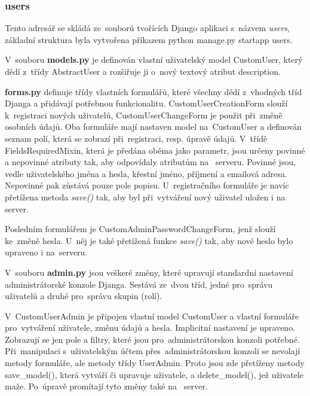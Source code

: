 \subsubsection{users}

Tento adresář se skládá ze~souborů tvořících Django aplikaci s~názvem
\textit{users}, základní struktura byla vytvořena příkazem
\textsf{python manage.py startapp users}.

V~souboru \textbf{models.py} je definován vlastní uživatelský model
\textsf{CustomUser}, který dědí z~třídy \textsf{AbstractUser} a
rozšiřuje ji o~nový textový atribut \textsf{description}.

\textbf{forms.py} definuje třídy vlastních formulářů, které všechny
dědí z~vhodných tříd Djanga a přidávají potřebnou
funkcionalitu. \textsf{CustomUserCreationForm} slouží k~registraci
nových uživatelů, \textsf{CustomUserChangeForm} je použit při~změně
osobních údajů. Oba formuláře mají nastaven model na~\textsf{CustomUser} 
a definován seznam polí, která se zobrazí při~registraci, 
resp. úpravě údajů. V~třídě \textsf{FieldsRequiredMixin},
která je předána oběma jako parametr, jsou určeny povinné a nepovinné
atributy tak, aby odpovídaly atributům na~ serveru. Povinné
jsou, vedle uživatelského jména a hesla, křestní jméno, příjmení a
emailová adresa. Nepovinné pak zůstává pouze pole popisu. 
U~registračního formuláře je navíc přetížena metoda \textit{save()} tak,
aby byl při~vytváření nový uživatel uložen i na~ server.

Posledním formulářem je \textsf{CustomAdminPasswordChangeForm}, jenž
slouží ke~změně hesla. U~něj je také přetížená funkce \textit{save()}
tak, aby nové heslo bylo upraveno i na~serveru.

V~souboru \textbf{admin.py} jsou veškeré změny, které upravují
standardní nastavení administrátorské konzole Djanga. Sestává ze~dvou
tříd, jedné pro~správu uživatelů a druhé pro~správu skupin (rolí).

V~\textsf{CustomUserAdmin} je připojen vlastní model
\textsf{CustomUser} a vlastní formuláře pro~vytváření uživatele, změnu
údajů a hesla. Implicitní nastavení je upraveno. Zobrazují se jen
pole a filtry, které jsou pro~administrátorskou konzoli potřebné. 
Při~manipulaci s~uživatelským účtem přes~administrátorskou konzoli se
nevolají metody formuláře, ale metody třídy \textsf{UserAdmin}. Proto
jsou zde přetíženy metody \textsf{save\_model()}, která vytváří či
upravuje uživatele, a \textsf{delete\_model()}, jež uživatele maže. 
Po~úpravě promítají tyto změny také na~ server.


